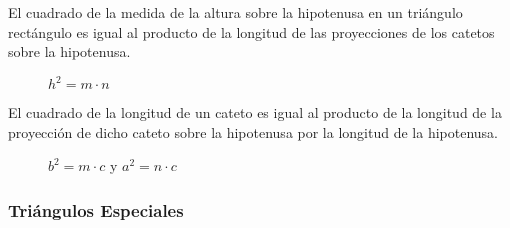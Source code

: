 \clearpage

\begin{theorem}
    El cuadrado de la medida de la altura sobre la hipotenusa en un triángulo rectángulo es igual al producto de la longitud de las proyecciones de los catetos sobre la hipotenusa.

    \begin{figure}[!h]
        \centering
        
        \caption{$h^2 = m \cdot n$}
        \label{fig:projection-hipotenusa-cateto}
    \end{figure}    
    
\end{theorem}

\begin{theorem}
    El cuadrado de la longitud de un cateto es igual al producto de la longitud de la proyección de dicho cateto sobre la hipotenusa por la longitud de la hipotenusa.

    \begin{figure}[!h]
        \centering
        
        \caption{$b^2 = m \cdot c$ y $a^2 = n \cdot c$}
        \label{fig:proyec-hipotenusa-producto}
    \end{figure}    
    
\end{theorem}

\clearpage

\subsubsection{Triángulos Especiales}


